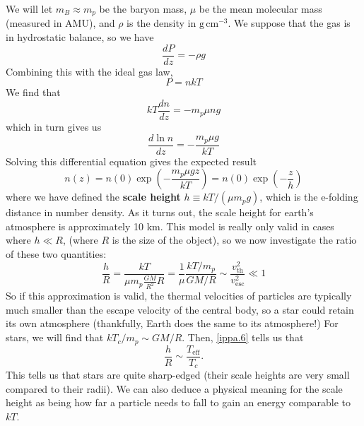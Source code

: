 \documentclass[10pt]{article}
\numberwithin{equation}{section}
\newcommand{\n}{\noindent}
\begin{document}
	 \n We will let $m_B\approx m_p$ be the baryon mass, $\mu$ be the mean molecular mass (measured in AMU), and $\rho$ is the density in $\mathrm{g\,cm^{-3}}$. We suppose that the gas is in hydrostatic balance, so we have
	 \begin{equation}
	 	\label{ippa.1} \frac{dP}{dz}=-\rho g
	 \end{equation}
	 Combining this with the ideal gas law,
	 \begin{equation}
	 	\label{ippa.2} P=nkT
	 \end{equation}
	We find that
	\begin{equation}
		\label{ippa.3} kT\frac{dn}{dz}=-m_p\mu ng
	\end{equation}
	which in turn gives us
	\begin{equation}
		\label{ippa.4} \frac{d\ln n}{dz}=-\frac{m_p\mu g}{kT}
	\end{equation}
	Solving this differential equation gives the expected result
	\begin{equation}
		\label{ippa.5} n(z)=n(0)\exp\left(-\frac{m_p\mu gz}{kT}\right)=n(0)\exp\left(-\frac{z}{h}\right)
	\end{equation}
	where we have defined the \textbf{scale height} $h\equiv kT/(\mu m_pg)$, which is the e-folding distance in number density. As it turns out, the scale height for earth's atmosphere is approximately 10 km. This model is really only valid in cases where $h\ll R$, (where $R$ is the size of the object), so we now investigate the ratio of these two quantities:
	\begin{equation}
		\label{ippa.6} \frac{h}{R}=\frac{kT}{\mu m_p\frac{GM}{R^2}R}=\frac{1}{\mu}\frac{kT/m_p}{GM/R}\sim \frac{v_{\mathrm{th}}^2}{v_{\mathrm{esc}}^2}\ll 1
	\end{equation}
	So if this approximation is valid, the thermal velocities of particles are typically much smaller than the escape velocity of the central body, so a star could retain its own atmosphere (thankfully, Earth does the same to its atmosphere!) For stars, we will find that $kT_c/m_p\sim GM/R$. Then, \eqref{ippa.6} tells us that
	\begin{equation}
		\label{ippa.7} \frac{h}{R}\sim \frac{T_{\mathrm{eff}}}{T_c}.
	\end{equation}
	This tells us that stars are quite sharp-edged (their scale heights are very small compared to their radii). We can also deduce a physical meaning for the scale height as being how far a particle needs to fall to gain an energy comparable to $kT$.\\
	
\end{document}
